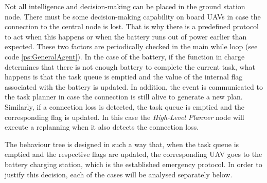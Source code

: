 Not all intelligence and decision-making can be placed in the ground station node. There must be some decision-making capability on board \glspl{UAV} in case the connection to the central node is lost. That is why there is a predefined protocol to act when this happens or when the battery runs out of power earlier than expected. These two factors are periodically checked in the main while loop (see code \ref{ps:GeneralAgent}). In the case of the battery, if the function in charge determines that there is not enough battery to complete the current task, what happens is that the task queue is emptied and the value of the internal flag associated with the battery is updated. In addition, the event is communicated to the task planner in case the connection is still alive to generate a new plan. Similarly, if a connection loss is detected, the task queue is emptied and the corresponding flag is updated. In this case the \emph{High-Level Planner} node will execute a replanning when it also detects the connection loss.

The behaviour tree is designed in such a way that, when the task queue is emptied and the respective flags are updated, the corresponding \gls{UAV} goes to the battery charging station, which is the established emergency protocol. In order to justify this decision, each of the cases will be analysed separately below.





